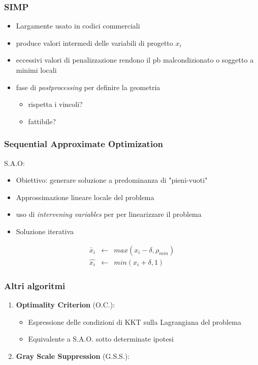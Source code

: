 \documentclass{beamer}
\begin{document}
\begin{frame}
	\frametitle{SIMP}
	\begin{itemize}
		\item Largamente usato in codici commerciali
		\item produce valori intermedi delle variabili di progetto $x_i$
		\item eccessivi valori di penalizzazione rendono il pb malcondizionato o soggetto a minimi locali
		\item fase di \textit{postprocessing} per definire la geometria
		\begin{itemize}
			\item rispetta i vincoli?
			\item fattibile?
		\end{itemize}
	\end{itemize}
\end{frame}



\begin{frame}
	\frametitle{Sequential Approximate Optimization}
	S.A.O: \cite{haftka2012elements}
	\begin{itemize}
		\item 	Obiettivo: generare soluzione a predominanza di "pieni-vuoti"
		\item Approssimazione lineare locale del problema
		\item uso di \textit{intervening variables} per per linearizzare il problema
		\item Soluzione iterativa
	\end{itemize}
	
	\begin{eqnarray}
	\check{x_i} & \leftarrow & max(x_i - \delta, \rho_{min}) \\
	\hat{x_i} & \leftarrow & min(x_i + \delta, 1)
	\end{eqnarray}
	
\end{frame}


\begin{frame}
	\frametitle{Altri algoritmi}
	\begin{enumerate}
		\item \textbf{Optimality Criterion} (O.C.): \cite{bendsoe1989optimal}
		\begin{itemize}
			\item Espressione delle condizioni di KKT sulla Lagrangiana del problema
			\item Equivalente a S.A.O. sotto determinate ipotesi 
		\end{itemize}
		\item \textbf{Gray Scale Suppression} (G.S.S.): \cite{groenwold2009simple}
	\end{enumerate}
\end{frame}
\end{document}
